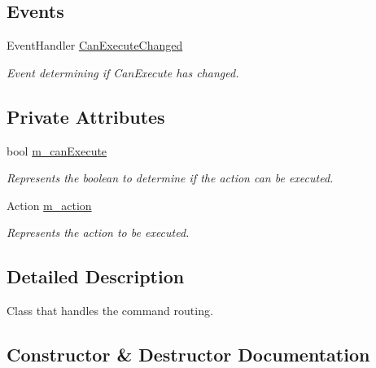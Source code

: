 \subsection*{Events}
\begin{DoxyCompactItemize}
\item 
Event\+Handler \mbox{\hyperlink{class_dungeons__n___dragons___manager_1_1_tools_1_1_command_handler_a3867bb6182e14e772e4583f91a4489c9}{Can\+Execute\+Changed}}
\begin{DoxyCompactList}\small\item\em Event determining if Can\+Execute has changed. \end{DoxyCompactList}\end{DoxyCompactItemize}
\subsection*{Private Attributes}
\begin{DoxyCompactItemize}
\item 
bool \mbox{\hyperlink{class_dungeons__n___dragons___manager_1_1_tools_1_1_command_handler_a9252e58068886384d67de2d4fa0fbda4}{m\+\_\+can\+Execute}}
\begin{DoxyCompactList}\small\item\em Represents the boolean to determine if the action can be executed. \end{DoxyCompactList}\item 
Action \mbox{\hyperlink{class_dungeons__n___dragons___manager_1_1_tools_1_1_command_handler_a76141a17c73bd659223aa90d2779aa66}{m\+\_\+action}}
\begin{DoxyCompactList}\small\item\em Represents the action to be executed. \end{DoxyCompactList}\end{DoxyCompactItemize}


\subsection{Detailed Description}
Class that handles the command routing. 



\subsection{Constructor \& Destructor Documentation}
\mbox{\label{class_dungeons__n___dragons___manager_1_1_tools_1_1_command_handler_abfd4f02a15a64024be13cc4c6b8d5f31}} 
